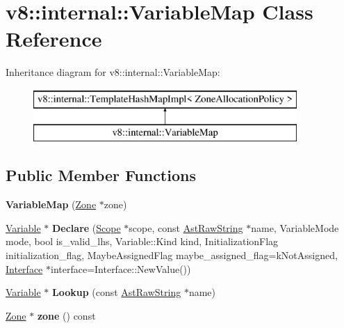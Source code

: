 \hypertarget{classv8_1_1internal_1_1_variable_map}{}\section{v8\+:\+:internal\+:\+:Variable\+Map Class Reference}
\label{classv8_1_1internal_1_1_variable_map}
Inheritance diagram for v8\+:\+:internal\+:\+:Variable\+Map\+:\begin{figure}[H]
\begin{center}
\leavevmode
\includegraphics[height=2.000000cm]{classv8_1_1internal_1_1_variable_map}
\end{center}
\end{figure}
\subsection*{Public Member Functions}
\begin{DoxyCompactItemize}
\item 
\hypertarget{classv8_1_1internal_1_1_variable_map_a63d73a883f8b9f084e7872c3750cc671}{}{\bfseries Variable\+Map} (\hyperlink{classv8_1_1internal_1_1_zone}{Zone} $\ast$zone)\label{classv8_1_1internal_1_1_variable_map_a63d73a883f8b9f084e7872c3750cc671}

\item 
\hypertarget{classv8_1_1internal_1_1_variable_map_a398ab6443b6e0935e2f9549036c5fbca}{}\hyperlink{classv8_1_1internal_1_1_variable}{Variable} $\ast$ {\bfseries Declare} (\hyperlink{classv8_1_1internal_1_1_scope}{Scope} $\ast$scope, const \hyperlink{classv8_1_1internal_1_1_ast_raw_string}{Ast\+Raw\+String} $\ast$name, Variable\+Mode mode, bool is\+\_\+valid\+\_\+lhs, Variable\+::\+Kind kind, Initialization\+Flag initialization\+\_\+flag, Maybe\+Assigned\+Flag maybe\+\_\+assigned\+\_\+flag=k\+Not\+Assigned, \hyperlink{classv8_1_1internal_1_1_interface}{Interface} $\ast$interface=Interface\+::\+New\+Value())\label{classv8_1_1internal_1_1_variable_map_a398ab6443b6e0935e2f9549036c5fbca}

\item 
\hypertarget{classv8_1_1internal_1_1_variable_map_a566cd8f5c461f1b0a6ab85b14d34228d}{}\hyperlink{classv8_1_1internal_1_1_variable}{Variable} $\ast$ {\bfseries Lookup} (const \hyperlink{classv8_1_1internal_1_1_ast_raw_string}{Ast\+Raw\+String} $\ast$name)\label{classv8_1_1internal_1_1_variable_map_a566cd8f5c461f1b0a6ab85b14d34228d}

\item 
\hypertarget{classv8_1_1internal_1_1_variable_map_a02ac9fc683ef097fac1e753c173c4566}{}\hyperlink{classv8_1_1internal_1_1_zone}{Zone} $\ast$ {\bfseries zone} () const \label{classv8_1_1internal_1_1_variable_map_a02ac9fc683ef097fac1e753c173c4566}

\end{DoxyCompactItemize}
